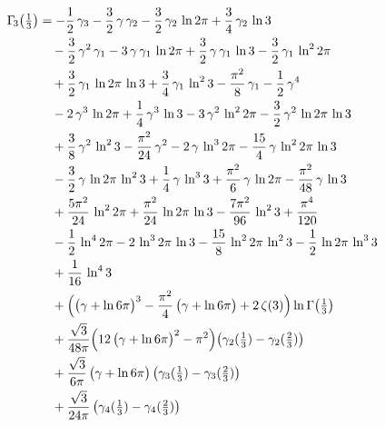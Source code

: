 \begin{align*}
\Gamma_{\!3}\bigl(\tfrac13\bigr) &= -\frac{1}{2}\,\gamma_{3}-\frac{3}{2}\,\gamma\,\gamma_{2}-\frac{3}{2}\,\gamma_{2}\,\ln 2\pi+\frac{3}{4}\,\gamma_{2}\,\ln 3 \\
 &\quad -\frac{3}{2}\,\gamma^{2}\,\gamma_{1}-3\,\gamma\,\gamma_{1}\,\ln 2\pi+\frac{3}{2}\,\gamma\,\gamma_{1}\,\ln 3-\frac{3}{2}\,\gamma_{1}\,\ln^{2} 2\pi \\
 &\quad +\frac{3}{2}\,\gamma_{1}\,\ln 2\pi\,\ln 3+\frac{3}{4}\,\gamma_{1}\,\ln^{2} 3-\frac{\pi^{2}}{8}\,\gamma_{1}-\frac{1}{2}\,\gamma^{4} \\
 &\quad -2\,\gamma^{3}\,\ln 2\pi+\frac{1}{4}\,\gamma^{3}\,\ln 3-3\,\gamma^{2}\,\ln^{2} 2\pi-\frac{3}{2}\,\gamma^{2}\,\ln 2\pi\,\ln 3 \\
 &\quad +\frac{3}{8}\,\gamma^{2}\,\ln^{2} 3-\frac{\pi^{2}}{24}\,\gamma^{2}-2\,\gamma\,\ln^{3} 2\pi-\frac{15}{4}\,\gamma\,\ln^{2} 2\pi\,\ln 3 \\
 &\quad -\frac{3}{2}\,\gamma\,\ln 2\pi\,\ln^{2} 3+\frac{1}{4}\,\gamma\,\ln^{3} 3+\frac{\pi^{2}}{6}\,\gamma\,\ln 2\pi-\frac{\pi^{2}}{48}\,\gamma\,\ln 3 \\
 &\quad +\frac{5\pi^{2}}{24}\,\ln^{2} 2\pi+\frac{\pi^{2}}{24}\,\ln 2\pi\,\ln 3-\frac{7\pi^{2}}{96}\,\ln^{2} 3+\frac{\pi^{4}}{120} \\
 &\quad -\frac{1}{2}\,\ln^{4} 2\pi-2\,\ln^{3} 2\pi\,\ln 3-\frac{15}{8}\,\ln^{2} 2\pi\,\ln^{2} 3-\frac{1}{2}\,\ln 2\pi\,\ln^{3} 3 \\
 &\quad +\frac{1}{16}\,\ln^{4} 3 \\
 &\quad +\Bigl(\bigl(\gamma+\ln 6\pi\bigr)^{3}-\frac{\pi^{2}}{4}\,\bigl(\gamma+\ln 6\pi\bigr)+2\,\zeta(3)\Bigr)\ln\Gamma\bigl(\tfrac13\bigr) \\
 &\quad +\frac{\sqrt{3}}{48\pi}\Bigl(12\,\bigl(\gamma+\ln 6\pi\bigr)^{2}-\pi^{2}\Bigr)\bigl(\gamma_{2}(\tfrac13)-\gamma_{2}(\tfrac23)\bigr) \\
 &\quad +\frac{\sqrt{3}}{6\pi}\,\bigl(\gamma+\ln 6\pi\bigr)\,\bigl(\gamma_{3}(\tfrac13)-\gamma_{3}(\tfrac23)\bigr) \\
 &\quad +\frac{\sqrt{3}}{24\pi}\,\bigl(\gamma_{4}(\tfrac13)-\gamma_{4}(\tfrac23)\bigr)
\end{align*}

